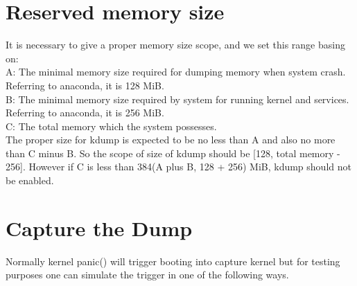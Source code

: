 \documentclass{article}
\begin{document}
\section{Reserved memory size}
\noindent
It is necessary to give a proper memory size scope, and we set this range basing
on:\\

\noindent
A: The minimal memory size required for dumping memory when system crash.
Referring to anaconda, it is 128 MiB.\\
B: The minimal memory size required by system for running kernel and
services. Referring to anaconda, it is 256 MiB.\\
C: The total memory which the system possesses.\\

\noindent
The proper size for kdump is expected to be no less than A and also no more than
C minus B. So the scope of size of kdump should be [128, total memory - 256].
However if C is less than 384(A plus B, 128 + 256) MiB, kdump should not be
enabled.

\section{Capture the Dump}

\noindent
Normally kernel panic() will trigger booting into capture kernel but for testing
purposes one can simulate the trigger in one of the following ways.\\
\end{document}

